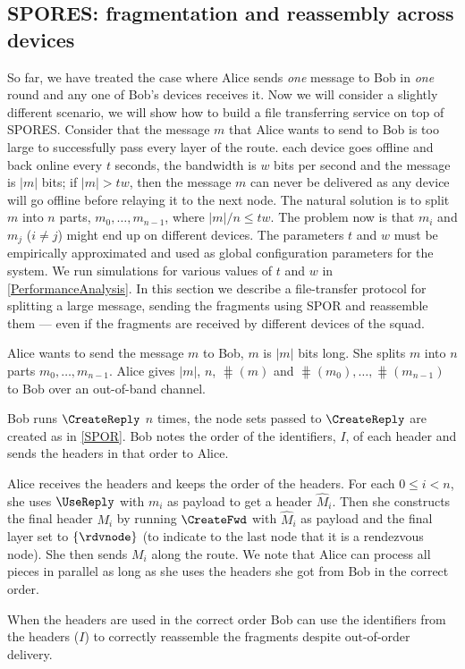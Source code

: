 \subsection{\acs{SPORES}: fragmentation and reassembly across devices}%
\label{SPORES}%
\label{sec:file_transfer}

So far, we have treated the case where Alice sends \emph{one} message to Bob in 
\emph{one} round and any one of Bob's devices receives it.
Now we will consider a slightly different scenario, we will show how to build a 
file transferring service on top of \ac{SPORES}.
Consider that the message \(m\) that Alice wants to send to Bob is too large to 
successfully pass every layer of the route.
\Eg each device goes offline and back online every \(t\) seconds, the bandwidth 
is \(w\) bits per second and the message is \(|m|\) bits; if \(|m| > t w\), 
then the message \(m\) can never be delivered as any device will go offline 
before relaying it to the next node.
The natural solution is to split \(m\) into \(n\) parts, \(m_0, \dotsc, 
  m_{n-1}\), where \(|m|/n\leq t w\).
The problem now is that \(m_i\) and \(m_j\) (\(i\neq j\)) might end up on 
different devices.
The parameters \(t\) and \(w\) must be empirically approximated and used as 
global configuration parameters for the system.
We run simulations for various values of \(t\) and \(w\) in 
\cref{PerformanceAnalysis}.
In this section we describe a file-transfer protocol for splitting a large 
message, sending the fragments using \ac{SPOR} and reassemble them --- even if 
the fragments are received by different devices of the squad.

Alice wants to send the message \(m\) to Bob, \(m\) is \(|m|\) bits long.
She splits \(m\) into \(n\) parts \(m_0, \dotsc, m_{n-1}\).
Alice gives \(|m|\), \(n\), \(\hash(m)\) and \(\hash(m_0), \dotsc, 
  \hash(m_{n-1})\) to Bob over an out-of-band channel.

Bob runs \(\CreateReply\) \(n\) times, the node sets passed to \(\CreateReply\) 
are created as in \cref{SPOR}.
Bob notes the order of the identifiers, \(I\), of each header and sends the 
headers in that order to Alice.

Alice receives the headers and keeps the order of the headers.
For each \(0\leq i < n\), she uses \(\UseReply\) with \(m_i\) as payload to get 
a header \(\hat M_i\).
Then she constructs the final header \(M_i\) by running \(\CreateFwd\) with 
\(\hat M_i\) as payload and the final layer set to \(\{\rdvnode\}\) (to 
indicate to the last node that it is a rendezvous node).
She then sends \(M_i\) along the route.
We note that Alice can process all pieces in parallel as long as she uses the 
headers she got from Bob in the correct order.

When the headers are used in the correct order Bob can use the identifiers from 
the headers (\(I\)) to correctly reassemble the fragments despite out-of-order 
delivery.

